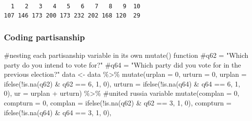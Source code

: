 \documentclass[
  letterpaper,
  DIV=11,
  numbers=noendperiod]{scrartcl}
\newenvironment{Shaded}{\begin{snugshade}}{\end{snugshade}}
\newcommand{\AttributeTok}[1]{\textcolor[rgb]{0.40,0.45,0.13}{#1}}
\newcommand{\CommentTok}[1]{\textcolor[rgb]{0.37,0.37,0.37}{#1}}
\newcommand{\DecValTok}[1]{\textcolor[rgb]{0.68,0.00,0.00}{#1}}
\newcommand{\FunctionTok}[1]{\textcolor[rgb]{0.28,0.35,0.67}{#1}}
\newcommand{\NormalTok}[1]{\textcolor[rgb]{0.00,0.23,0.31}{#1}}
\newcommand{\OtherTok}[1]{\textcolor[rgb]{0.00,0.23,0.31}{#1}}
\newcommand{\SpecialCharTok}[1]{\textcolor[rgb]{0.37,0.37,0.37}{#1}}
\begin{document}
\begin{Shaded}
\end{Shaded}

\begin{verbatim}

  1   2   3   4   5   6   7   8   9  10 
107 146 173 200 173 232 202 168 120  29 
\end{verbatim}

\subsubsection{Coding partisanship}\label{coding-partisanship}

\begin{Shaded}
\begin{Highlighting}[]
\CommentTok{\#nesting each partisanship variable in its own mutate() function}
\CommentTok{\#q62 = "Which party do you intend to vote for?"}
\CommentTok{\#q64 = "Which party did you vote for in the previous election?"}
\NormalTok{data }\OtherTok{\textless{}{-}}\NormalTok{ data }\SpecialCharTok{\%\textgreater{}\%} 
  \FunctionTok{mutate}\NormalTok{(}\AttributeTok{urplan =} \DecValTok{0}\NormalTok{, }\AttributeTok{urturn =} \DecValTok{0}\NormalTok{,}
         \AttributeTok{urplan =} \FunctionTok{ifelse}\NormalTok{(}\SpecialCharTok{!}\FunctionTok{is.na}\NormalTok{(q62) }\SpecialCharTok{\&}\NormalTok{ q62 }\SpecialCharTok{==} \DecValTok{6}\NormalTok{, }\DecValTok{1}\NormalTok{, }\DecValTok{0}\NormalTok{),}
         \AttributeTok{urturn =} \FunctionTok{ifelse}\NormalTok{(}\SpecialCharTok{!}\FunctionTok{is.na}\NormalTok{(q64) }\SpecialCharTok{\&}\NormalTok{ q64 }\SpecialCharTok{==} \DecValTok{6}\NormalTok{, }\DecValTok{1}\NormalTok{, }\DecValTok{0}\NormalTok{),}
         \AttributeTok{ur =}\NormalTok{ urplan }\SpecialCharTok{+}\NormalTok{ urturn) }\SpecialCharTok{\%\textgreater{}\%} \CommentTok{\#united russia variable}
  \FunctionTok{mutate}\NormalTok{(}\AttributeTok{complan =} \DecValTok{0}\NormalTok{, }\AttributeTok{compturn =} \DecValTok{0}\NormalTok{,}
         \AttributeTok{complan =} \FunctionTok{ifelse}\NormalTok{(}\SpecialCharTok{!}\FunctionTok{is.na}\NormalTok{(q62) }\SpecialCharTok{\&}\NormalTok{ q62 }\SpecialCharTok{==} \DecValTok{3}\NormalTok{, }\DecValTok{1}\NormalTok{, }\DecValTok{0}\NormalTok{),}
         \AttributeTok{compturn =} \FunctionTok{ifelse}\NormalTok{(}\SpecialCharTok{!}\FunctionTok{is.na}\NormalTok{(q64) }\SpecialCharTok{\&}\NormalTok{ q64 }\SpecialCharTok{==} \DecValTok{3}\NormalTok{, }\DecValTok{1}\NormalTok{, }\DecValTok{0}\NormalTok{),}

\end{Highlighting}
\end{Shaded}
\end{document}
